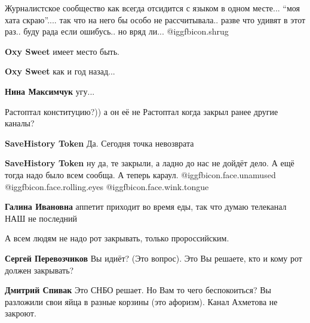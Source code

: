  
 
 
 
 
\zzSecCmt

\begin{itemize} %

Журналистское сообщество как всегда отсидится с языком в одном месте... \enquote{моя
хата скраю}.... так что на него бы особо не рассчитывала.. разве что удивят в
этот раз.. буду рада если ошибусь.. но вряд ли... @igg{fbicon.shrug} 

\begin{itemize} %
\textbf{Oxy Sweet} имеет место быть.

\textbf{Oxy Sweet} как и год назад...

\textbf{Нина Максимчук} угу...
\end{itemize} %


Растоптал конституцию?)) а он её не Растоптал когда закрыл ранее другие каналы?

\begin{itemize} %
\textbf{SaveHistory Token} Да. Сегодня точка невозврата

\textbf{SaveHistory Token} ну да, те закрыли, а ладно до нас не дойдёт дело. А ещё тогда надо было всем сообща. А теперь караул.  @igg{fbicon.face.unamused}  @igg{fbicon.face.rolling.eyes}  @igg{fbicon.face.wink.tongue} 

\textbf{Галина Ивановна} аппетит приходит во время еды, так что думаю телеканал НАШ не последний
\end{itemize} %

А всем людям не надо рот закрывать, только пророссийским.

\begin{itemize} %
\textbf{Сергей Перевозчиков} Вы идиёт? (Это вопрос).
Это Вы решаете, кто и кому рот должен закрывать?

\textbf{Дмитрий Спивак} Это СНБО решает. Но Вам то чего беспокоиться? Вы разложили свои яйца в разные корзины (это афоризм). Канал Ахметова не закроют.


\end{itemize}
\end{itemize}
